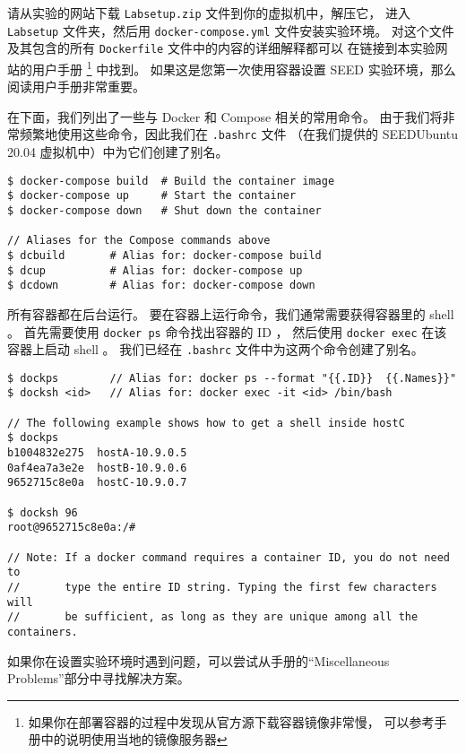 请从实验的网站下载 \texttt{Labsetup.zip} 文件到你的虚拟机中，解压它，
进入 \texttt{Labsetup} 文件夹，然后用 \texttt{docker-compose.yml} 文件安装实验环境。
对这个文件及其包含的所有 \texttt{Dockerfile} 文件中的内容的详细解释都可以
在链接到本实验网站的用户手册 \footnote{
    如果你在部署容器的过程中发现从官方源下载容器镜像非常慢，
    可以参考手册中的说明使用当地的镜像服务器
} 中找到。
如果这是您第一次使用容器设置 SEED 实验环境，那么阅读用户手册非常重要。

在下面，我们列出了一些与 Docker 和 Compose 相关的常用命令。
由于我们将非常频繁地使用这些命令，因此我们在 \texttt{.bashrc} 文件
（在我们提供的 SEEDUbuntu 20.04 虚拟机中）中为它们创建了别名。


\begin{lstlisting}
$ docker-compose build  # Build the container image
$ docker-compose up     # Start the container
$ docker-compose down   # Shut down the container

// Aliases for the Compose commands above
$ dcbuild       # Alias for: docker-compose build
$ dcup          # Alias for: docker-compose up
$ dcdown        # Alias for: docker-compose down
\end{lstlisting}


所有容器都在后台运行。
要在容器上运行命令，我们通常需要获得容器里的 shell 。
首先需要使用 \texttt{docker ps} 命令找出容器的 ID ，
然后使用 \texttt{docker exec} 在该容器上启动 shell 。
我们已经在 \texttt{.bashrc} 文件中为这两个命令创建了别名。

\begin{lstlisting}
$ dockps        // Alias for: docker ps --format "{{.ID}}  {{.Names}}"
$ docksh <id>   // Alias for: docker exec -it <id> /bin/bash

// The following example shows how to get a shell inside hostC
$ dockps
b1004832e275  hostA-10.9.0.5
0af4ea7a3e2e  hostB-10.9.0.6
9652715c8e0a  hostC-10.9.0.7

$ docksh 96
root@9652715c8e0a:/#

// Note: If a docker command requires a container ID, you do not need to
//       type the entire ID string. Typing the first few characters will
//       be sufficient, as long as they are unique among all the containers.
\end{lstlisting}


如果你在设置实验环境时遇到问题，可以尝试从手册的``Miscellaneous Problems''部分中寻找解决方案。
